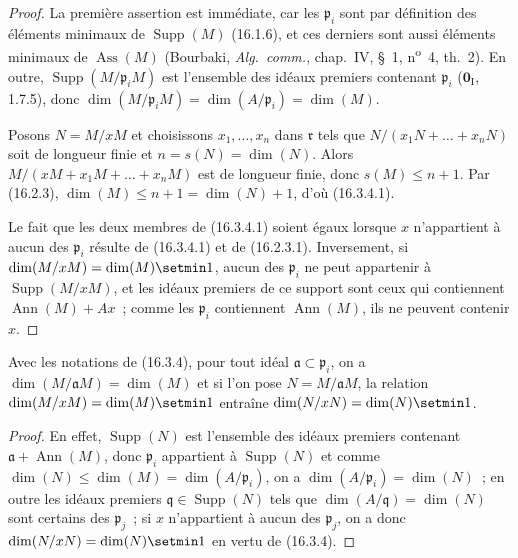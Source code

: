 \begin{proof}
La première assertion est immédiate, car les $\mathfrak{p}_i$ sont par
définition des éléments minimaux de $\operatorname{Supp}(M)$ (16.1.6), et ces
derniers sont aussi éléments minimaux de $\operatorname{Ass}(M)$ (Bourbaki,
\emph{Alg.~comm.}, chap.~IV, \S~1, n\textsuperscript{o}~4, th.~2). En outre,
$\operatorname{Supp}(M/\mathfrak{p}_iM)$ est l'ensemble des idéaux premiers
contenant $\mathfrak{p}_i$ ($\mathbf{0}_{\mathrm I}$, 1.7.5), donc
$\dim(M/\mathfrak{p}_iM)=\dim(A/\mathfrak{p}_i)=\dim(M)$.

Posons $N=M/xM$ et choisissons $x_1,\ldots,x_n$ dans $\mathfrak{r}$ tels
que $N/(x_1N+\ldots+x_nN)$ soit de longueur finie et $n=s(N)=\dim(N)$.
Alors $M/(xM+x_1M+\ldots+x_nM)$ est de longueur finie, donc $s(M)\leq n+1$.
Par (16.2.3), $\dim(M)\leq n+1=\dim(N)+1$, d'où (16.3.4.1).

Le fait que les deux membres de (16.3.4.1) soient égaux lorsque $x$
n'appartient à aucun des $\mathfrak{p}_i$ résulte de (16.3.4.1) et de
(16.2.3.1). Inversement, si
$\dim(M/xM)=\dim(M)\setmin 1$, aucun des $\mathfrak{p}_i$ ne peut appartenir à
$\operatorname{Supp}(M/xM)$, et les idéaux premiers de ce support sont ceux
qui contiennent $\operatorname{Ann}(M)+Ax$~; comme les $\mathfrak{p}_i$
contiennent $\operatorname{Ann}(M)$, ils ne peuvent contenir $x$.
\end{proof}

\begin{corollary}[16.3.5]
\label{0.16.3.5-fr}
Avec les notations de \textup{(16.3.4)}, pour tout idéal
$\mathfrak{a}\subset\mathfrak{p}_i$, on a
$\dim(M/\mathfrak{a}M)=\dim(M)$ et si l'on pose
$N=M/\mathfrak{a}M$, la relation $\dim(M/xM)=\dim(M)\setmin 1$ entraîne
$\dim(N/xN)=\dim(N)\setmin 1$.
\end{corollary}

\begin{proof}
En effet, $\operatorname{Supp}(N)$ est l'ensemble des idéaux premiers
contenant $\mathfrak{a}+\operatorname{Ann}(M)$, donc $\mathfrak{p}_i$
appartient à $\operatorname{Supp}(N)$ et comme
$\dim(N)\leq\dim(M)=\dim(A/\mathfrak{p}_i)$, on a
$\dim(A/\mathfrak{p}_i)=\dim(N)$~; en outre les idéaux premiers
$\mathfrak{q}\in\operatorname{Supp}(N)$ tels que
$\dim(A/\mathfrak{q})=\dim(N)$ sont certains des $\mathfrak{p}_j$~; si $x$
n'appartient à aucun des $\mathfrak{p}_j$, on a donc
$\dim(N/xN)=\dim(N)\setmin 1$ en vertu de (16.3.4).
\end{proof}

